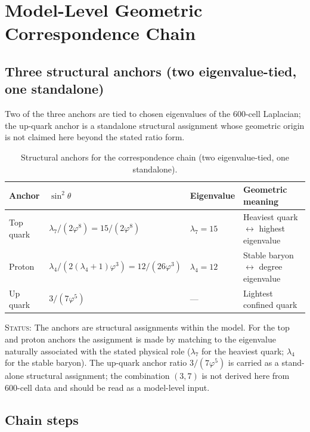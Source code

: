\documentclass[12pt]{article}
\newcommand{\phig}{\varphi}
\begin{document}
\section{Model-Level Geometric Correspondence Chain}\label{sec:chain}

\subsection{Three structural anchors (two eigenvalue-tied, one standalone)}

Two of the three anchors are tied to chosen eigenvalues of the 600-cell Laplacian; the up-quark anchor is a standalone structural assignment whose geometric origin is not claimed here beyond the stated ratio form.

\begin{table}[ht]
\centering
\caption{Structural anchors for the correspondence chain (two eigenvalue-tied, one standalone).}
\label{tab:anchors}
\begin{tabular}{@{}llll@{}}
\toprule
Anchor & $\sin^2\theta$ & Eigenvalue & Geometric meaning \\
\midrule
Top quark & $\lambda_7 / (2\phig^8) = 15/(2\phig^8)$ & $\lambda_7 = 15$ & Heaviest quark $\leftrightarrow$ highest eigenvalue \\
Proton & $\lambda_4 / (2(\lambda_4{+}1)\phig^3) = 12/(26\phig^3)$ & $\lambda_4 = 12$ & Stable baryon $\leftrightarrow$ degree eigenvalue \\
Up quark & $3/(7\phig^5)$ & --- & Lightest confined quark \\
\bottomrule
\end{tabular}
\end{table}

\textsc{Status:} The anchors are structural assignments within the model. For the top and proton anchors the assignment is made by matching to the eigenvalue naturally associated with the stated physical role ($\lambda_7$ for the heaviest quark; $\lambda_4$ for the stable baryon). The up-quark anchor ratio $3/(7\phig^5)$ is carried as a stand-alone structural assignment; the combination $(3, 7)$ is not derived here from 600-cell data and should be read as a model-level input.

\subsection{Chain steps}
\end{document}
